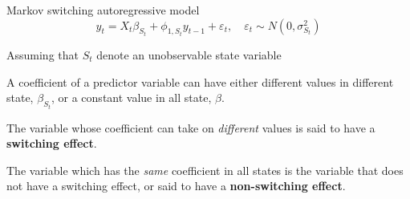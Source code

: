 \documentclass{beamer}
\begin{document}
\begin{frame}

\begin{block}{Markov switching autoregressive model}
	\[
	y_{t} = X_{t}\beta_{S_{t}} + \phi_{1,S_{t}} y_{t-1} + \varepsilon_{t}, \quad \varepsilon_{t} \sim N(0,\sigma^{2}_{S_{t}})
	\]
\end{block}

Assuming that $S_{t}$ denote an unobservable state variable

\vspace{1em}

A coefficient of a predictor variable can have either different values in different state, $\beta_{S_{t}}$,  or a constant value in all state, $\beta$. 

\vspace{1em}

The variable whose coefficient can take on \textit{different} values is said to have a \textbf{switching effect}. 

\vspace{1em}

The variable which has the \textit{same} coefficient in all states is the variable that does not have a switching effect, or said to have a \textbf{non-switching effect}. 
\end{frame}

\end{document}
